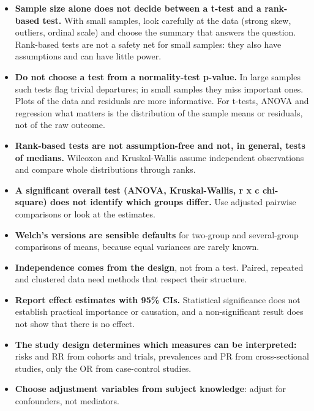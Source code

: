 \documentclass[style1, note, nocover]{neudata}
\begin{document}
\vspace{6pt}
\begin{tcolorbox}[enhanced, colback=white, colframe=corange, boxrule=0.8pt, arc=2pt, left=6pt, right=6pt, top=4pt, bottom=4pt,
  title={Principles that matter more than any flowchart}, coltitle=NeudataNavy, colbacktitle=white, fonttitle=\normalsize,
  attach boxed title to top left={xshift=6pt, yshift=-2pt}, boxed title style={colframe=white, colback=white}]
\small
\begin{itemize}
\item \textbf{Sample size alone does not decide between a t-test and a rank-based test.} With small samples, look carefully at the data (strong skew, outliers, ordinal scale) and choose the summary that answers the question. Rank-based tests are not a safety net for small samples: they also have assumptions and can have little power.
\item \textbf{Do not choose a test from a normality-test p-value.} In large samples such tests flag trivial departures; in small samples they miss important ones. Plots of the data and residuals are more informative. For t-tests, ANOVA and regression what matters is the distribution of the sample means or residuals, not of the raw outcome.
\item \textbf{Rank-based tests are not assumption-free and not, in general, tests of medians.} Wilcoxon and Kruskal-Wallis assume independent observations and compare whole distributions through ranks.
\item \textbf{A significant overall test (ANOVA, Kruskal-Wallis, r x c chi-square) does not identify which groups differ.} Use adjusted pairwise comparisons or look at the estimates.
\item \textbf{Welch's versions are sensible defaults} for two-group and several-group comparisons of means, because equal variances are rarely known.
\item \textbf{Independence comes from the design}, not from a test. Paired, repeated and clustered data need methods that respect their structure.
\item \textbf{Report effect estimates with 95\% CIs.} Statistical significance does not establish practical importance or causation, and a non-significant result does not show that there is no effect.
\item \textbf{The study design determines which measures can be interpreted:} risks and RR from cohorts and trials, prevalences and PR from cross-sectional studies, only the OR from case-control studies.
\item \textbf{Choose adjustment variables from subject knowledge}: adjust for confounders, not mediators.
\end{itemize}
\end{tcolorbox}
\neudatacopyrightpage
\end{document}
